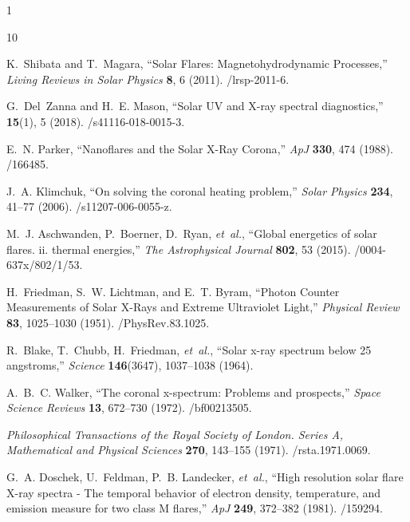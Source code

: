 \documentclass[12pt]{spieman}  %
\newcommand{\apj}{ApJ}
\begin{document}
\begin{spacing}{1}

\begin{thebibliography}{10}

K.~{Shibata} and T.~{Magara}, ``{Solar Flares: Magnetohydrodynamic Processes},'' {\em Living Reviews in Solar Physics} {\bf 8}, 6  (2011).
/lrsp-2011-6.

G.~Del~Zanna and H.~E. Mason, ``Solar {{UV}} and {{X-ray}} spectral diagnostics,''  {\bf 15}(1), 5  (2018).
/s41116-018-0015-3.

E.~N. {Parker}, ``{Nanoflares and the Solar X-Ray Corona},'' {\em \apj} {\bf 330}, 474  (1988).
/166485.

J.~A. Klimchuk, ``On solving the coronal heating problem,'' {\em Solar Physics} {\bf 234}, 41–77  (2006).
/s11207-006-0055-z.

M.~J. Aschwanden, P.~Boerner, D.~Ryan, {\em et~al.}, ``Global energetics of solar flares. ii. thermal energies,'' {\em The Astrophysical Journal} {\bf 802}, 53  (2015).
/0004-637x/802/1/53.

H.~{Friedman}, S.~W. {Lichtman}, and E.~T. {Byram}, ``{Photon Counter Measurements of Solar X-Rays and Extreme Ultraviolet Light},'' {\em Physical Review} {\bf 83}, 1025--1030  (1951).
/PhysRev.83.1025.

R.~Blake, T.~Chubb, H.~Friedman, {\em et~al.}, ``Solar x-ray spectrum below 25 angstroms,'' {\em Science} {\bf 146}(3647), 1037--1038  (1964).

A.~B.~C. Walker, ``The coronal x-spectrum: Problems and prospects,'' {\em Space Science Reviews} {\bf 13}, 672–730  (1972).
/bf00213505.

 {\em Philosophical Transactions of the Royal Society of London. Series A, Mathematical and Physical Sciences} {\bf 270}, 143–155  (1971).
/rsta.1971.0069.

G.~A. {Doschek}, U.~{Feldman}, P.~B. {Landecker}, {\em et~al.}, ``{High resolution solar flare X-ray spectra - The temporal behavior of electron density, temperature, and emission measure for two class M flares},'' {\em \apj} {\bf 249}, 372--382  (1981).
/159294.


\end{thebibliography}
\end{spacing}
\end{document}
